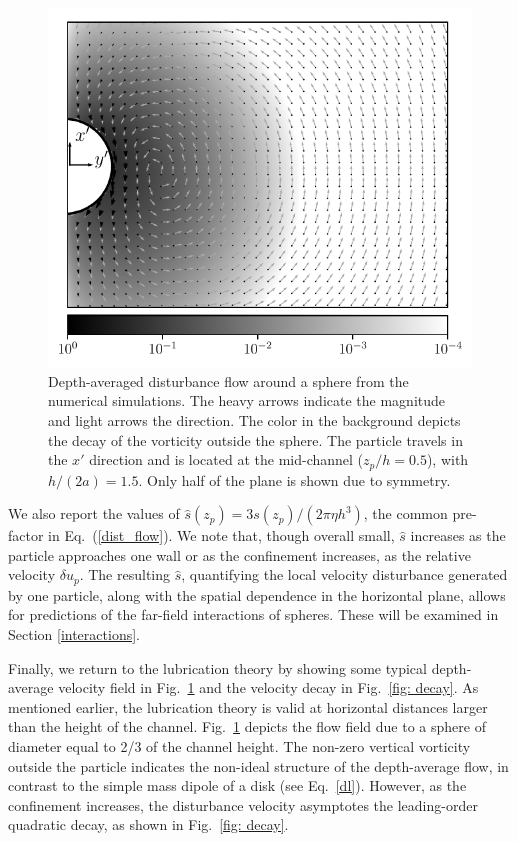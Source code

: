 \begin{figure}[t!]
 \begin{center}
\includegraphics[width=.7\columnwidth]{flow_vort-40k_small.pdf}
\end{center}
  \caption{Depth-averaged disturbance flow around a sphere from the numerical simulations. The heavy arrows indicate the magnitude and light arrows the direction. The color in the background depicts the decay of the vorticity outside the sphere. The particle travels in the $x'$ direction and is located at the mid-channel ($z_p/h=0.5$), with $h/(2a)=1.5$. Only half of the plane is shown due to symmetry.}
 \label{fig: flow}
\end{figure}

We also report the values of 
$\hat{s}(z_p)=3s(z_p)/(2\pi\eta h^3)$, %
the common pre-factor in Eq.~(\ref{dist_flow}). We note that, though overall small, $\hat{s}$ increases as the particle approaches one wall or as the confinement increases, as the relative velocity $\delta u_p$. The resulting $\hat{s}$, quantifying the local velocity disturbance generated by one particle, along with the spatial dependence in the horizontal plane, allows for predictions of the far-field interactions of spheres. These will be examined  in Section \ref{interactions}.

Finally, we return to the lubrication theory by showing some typical depth-average velocity field in Fig.\ \ref{fig: flow} and the velocity decay in Fig.\ \ref{fig: decay}. As mentioned earlier,
the lubrication theory is valid at horizontal distances larger than the height of the channel.
Fig.\ \ref{fig: flow} depicts the flow field due to a sphere of diameter equal to 2/3 of the channel height. The non-zero vertical vorticity outside the particle indicates the non-ideal structure of the depth-average flow, in contrast to the simple mass dipole of a disk (see Eq.~\ref{dl}). However, as the confinement increases, the disturbance velocity asymptotes the leading-order quadratic decay, as shown in Fig.\ \ref{fig: decay}.


